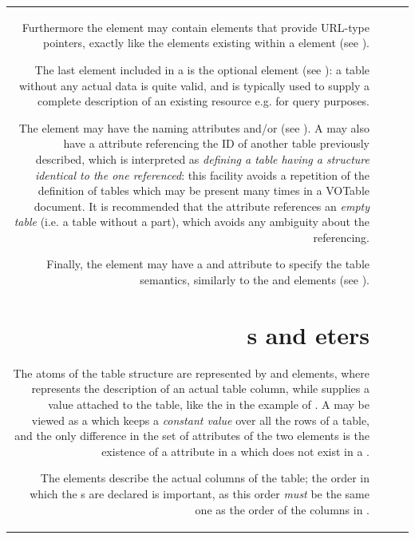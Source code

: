 \begin{tabular}{RRCp{0.8\textwidth}}
\begin{center}
Furthermore the  element may contain {} elements
that provide URL-type pointers, exactly like the {} elements 
existing within a  element (see ).

The last element included in a  is the optional  
element (see ): a table without any
actual data is quite valid, and is typically used to supply a complete
description of an existing resource e.g. for query purposes.

The  element may have the naming attributes  and/or 
 (see ). A 
may also have a  attribute referencing the ID of another
table previously described, which is interpreted as
{\em defining a table having a structure identical to the one referenced}:
this facility avoids a repetition of the definition of tables which
may be present many times in a VOTable document. 
It is recommended that the  attribute
references an {\em empty table} (i.e. a table without a 
 part), which avoids any ambiguity
about the referencing. 

Finally, the  element may have a  and 
attribute to specify the table semantics, similarly to  the  and
 elements (see ).

\section{\texorpdfstring{s and eters}
                        {FIELDs and PARAMeters}}
\label{sec:field}

The atoms of the table structure are represented by  and
 elements, where  represents the description
of an actual table column, while  supplies a value
attached to the table, like the 
in the example of . A  may be
viewed as a  which keeps a {\em constant value} over all
the rows of a table, and the only difference in the set of attributes
of the two elements
is the existence of a  attribute in a 
which does not exist in a .

The   elements describe the actual columns of the table;
the order in which the s are declared is important,
as this order {\em must} be the same one as the order of the 
columns in .


\end{center}
\end{tabular}
